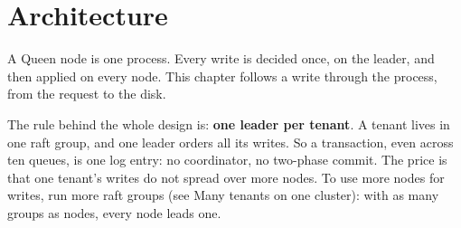
\chapter{Architecture}

A Queen node is one process. Every write is decided once, on the leader, and then applied on every
node. This chapter follows a write through the process, from the request to the disk.

The rule behind the whole design is: \textbf{one leader per tenant}. A tenant lives in one raft
group, and one leader orders all its writes. So a transaction, even across ten queues, is one log
entry: no coordinator, no two-phase commit. The price is that one tenant's writes do not spread
over more nodes. To use more nodes for writes, run more raft groups (see Many tenants on one
cluster): with as many groups as nodes, every node leads one.









